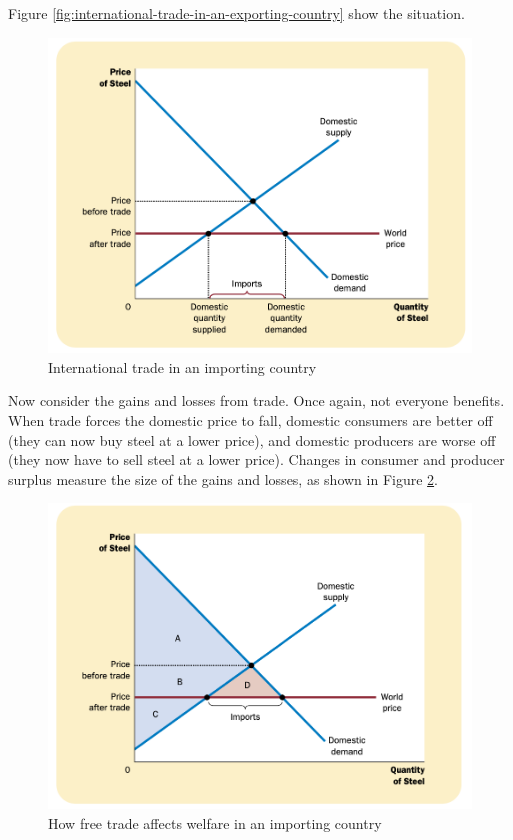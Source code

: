 Figure \ref{fig:international-trade-in-an-exporting-country} show the situation.

\begin{figure}[!ht]
  \centering
  \includegraphics[width=\textwidth]{pics/international-trade-in-an-importing-country}
  \caption{International trade in an importing country}
  \label{fig:internaltional-trade-in-an-importing-country}
\end{figure}



Now consider the gains and losses from trade. Once again, not everyone benefits. When trade forces the domestic price to fall, domestic consumers are better off (they can now buy steel at a lower price), and domestic producers are worse off (they now have to sell steel at a lower price). Changes in consumer and producer surplus measure the size of the gains and losses, as shown in Figure \ref{fig:how-free-trade-affects-welfare-in-an-importing-country}.

\begin{figure}[!ht]
  \centering
  \includegraphics[width=\textwidth]{pics/how-free-trade-affects-welfare-in-an-importing-country}
  \caption{How free trade affects welfare in an importing country}
  \label{fig:how-free-trade-affects-welfare-in-an-importing-country}
\end{figure}


